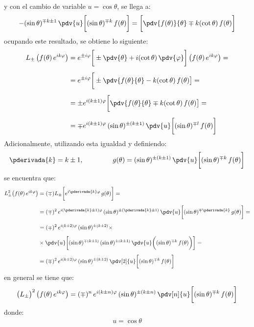 y con el cambio de variable $u = \cos \theta$, se llega a:
\begin{align*}
-(\sin \theta)^{\mp k \pm 1} \, \pdv{u} \bigg[ (\sin \theta)^{\mp k} \, f(\theta) \bigg] = \bigg[ \pdv{f(\theta)}{\theta} \mp k (\cot \theta) \, f(\theta) \bigg]
\end{align*}
ocupando este resultado, se obtiene lo siguiente:
\begin{align*}
L_{\pm} \, \big( f(\theta) \, e^{i k \varphi} \big) &= e^{\pm i \varphi} \bigg[ \pm \pdv{\theta} + i (\cot \theta) \, \pdv{\varphi} \bigg] \, \big( f(\theta) \, e^{i k \varphi} \big) = \\[0.5em]
&= e^{\pm i \varphi} \bigg[ \pm \pdv{f(\theta}{\theta} - k (\cot \theta) \, f(\theta) \big] = \\[0.5em]
&= \pm e^{i (k \pm 1) \varphi} \bigg[ \pdv{f(\theta}{\theta} \mp k (\cot \theta) \, f(\theta) \big] = \\[0.5em]
&= \mp e^{i (k \pm 1) \varphi} \, (\sin \theta)^{\pm (k \pm 1)} \, \pdv{u} \bigg[ (\sin \theta)^{\mp l} \, f(\theta) \bigg]
\end{align*}
Adicionalmente, utilizando esta igualdad y definiendo:
\begin{align*}
\pderivada{k} = k \pm 1, \hspace{1.5cm} g(\theta) = (\sin \theta)^{\pm (k \pm 1)} \, \pdv{u} \bigg[ (\sin \theta)^{\mp k} \, f(\theta) \bigg]
\end{align*}
se encuentra que:
\begin{align*}
L_{\pm}^{2} \big( f(\theta) \, e^{i k \varphi} \big) &= (\mp) L_{\pm} \bigg[ e^{i \pderivada{k} \varphi} \, g(\theta) \bigg] = \\[0.5em]
&= (\mp)^{2} \, e^{i (\pderivada{k} \pm 1) \varphi} \, (\sin \theta)^{\pm (\pderivada{k} \pm 1)} \, \pdv{u} \bigg[ (\sin \theta)^{\mp \pderivada{k}} \, g(\theta) \bigg] = \\[0.5em]
&= (\mp)^{2} \, e^{i (k \pm 2) \varphi} \, (\sin \theta)^{\pm (k \pm 2)} \times \\[0.5em]
&\times \pdv{u} \bigg[ (\sin \theta)^{\mp (k \pm 1)} \, (\sin \theta)^{\pm (k \pm 1)} \, \pdv{u} \bigg( (\sin \theta)^{\mp k} \, f(\theta) \bigg) \bigg] = \\[0.5em]
&= (\mp)^{2} \, e^{i (k \pm 2) \varphi} \, (\sin \theta)^{\pm (k \pm 2)} \, \pdv[2]{u} \bigg[ (\sin \theta)^{\mp k} \, f(\theta) \bigg]
\end{align*}
en general se tiene que:
\begin{align}
\big( L_{\pm} \big)^{2} \, \big( f(\theta) \, e^{i k \varphi} \big) = (\mp)^{n} \, e^{i (k \pm n) \varphi} \, (\sin \theta)^{\pm (k \pm n)} \, \pdv[n]{u} \bigg[ (\sin \theta)^{\mp k} \, f(\theta) \bigg]
\label{eq:ecuacion_10_160}
\end{align}
donde:
\begin{align*}
u = \cos \theta
\end{align*}

